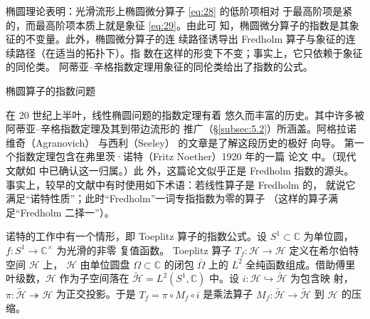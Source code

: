 \documentclass[11pt]{amsart}
\makeatletter
\def\subsection{\@startsection{subsection}{2}%
   \z@{1.25\linespacing\@plus.7\linespacing}{.5\linespacing}%
   {\normalfont\bfseries}}
\theoremstyle{definition}
\theoremstyle{remark}
\theoremstyle{plain}
\numberwithin{equation}{section}
\renewcommand{\:}{\colon}
\newcommand{\CC}{{\mathbb C}}
\newcommand{\cir}{S^1}
\newcommand{\sH}{\mathscr{H}}
\newcommand{\tsH}{\widetilde{\sH}}
\makeatother
\begin{document}
椭圆理论表明：光滑流形上椭圆微分算子 \eqref{eq:28} 的低阶项相对
于最高阶项是紧的，而最高阶项本质上就是象征 \eqref{eq:29}。由此可
知，椭圆微分算子的指数是其象征的不变量。此外，椭圆微分算子的连
续路径诱导出 Fredholm 算子与象征的连续路径（在适当的拓扑下）。指
数在这样的形变下不变；事实上，它只依赖于象征的同伦类。
阿蒂亚–辛格指数定理用象征的同伦类给出了指数的公式。

\subsection{椭圆算子的指数问题}\label{subsec:3.3}

在 20 世纪上半叶，线性椭圆问题的指数定理有着
悠久而丰富的历史。其中许多被阿蒂亚–辛格指数定理及其到带边流形的
推广（\S\ref{subsec:5.2}）所涵盖。阿格拉诺维奇（Agranovich）
\cite{Agr} 与西利（Seeley）\cite{Se1} 的文章是了解这段历史的极好
向导。
第一个指数定理包含在弗里茨·诺特（Fritz Noether）1920 年的一篇
论文 \cite{N} 中。（现代文献如 \cite{E,AM} 中已确认这一归属。）此
外，这篇论文似乎正是 Fredholm 指数的源头。
事实上，较早的文献中有时使用如下术语：若线性算子是 Fredholm 的，
就说它满足“诺特性质”；此时“Fredholm”一词专指指数为零的算子
（这样的算子满足“Fredholm 二择一”）。

诺特的工作中有一个情形，即 Toeplitz 算子的指数公式。设
$\cir\subset \CC$ 为单位圆，$f\:\cir\to \CC^\times $ 为光滑的非零
复值函数。
Toeplitz 算子 $T_f\:\sH\to \sH$ 定义在希尔伯特空间 $\sH$ 上，
$\sH$ 由单位圆盘 $\Omega \subset \CC$ 的闭包 $\overline{\Omega }$
上的 $L^2$ 全纯函数组成。借助傅里叶级数，$\sH$ 作为子空间落在
$\tsH=L^2(\cir,\CC)$ 中。设 $i\:\sH\hookrightarrow \tsH$ 为包含映
射，$\pi \:\tsH\twoheadrightarrow\sH$ 为正交投影。于是
$T_f=\pi \circ M_f\circ i$ 是乘法算子 $M_f\:\tsH\to \tsH$ 到 $\sH$
的压缩。
\end{document}
